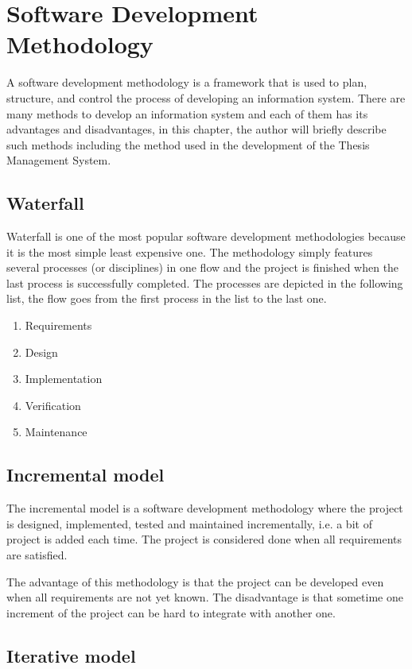 \chapter{Software Development Methodology}

A software development methodology is a framework that is used to plan, structure, and control the process of developing an information system. There are many methods to develop an information system and each of them has its advantages and disadvantages, in this chapter, the author will briefly describe such methods including the method used in the development of the Thesis Management System.

\section{Waterfall}

Waterfall is one of the most popular software development methodologies because it is the most simple least expensive one. The methodology simply features several processes (or disciplines) in one flow and the project is finished when the last process is successfully completed. The processes are depicted in the following list, the flow goes from the first process in the list to the last one.

\begin{enumerate}
    \item Requirements
    \item Design
    \item Implementation
    \item Verification
    \item Maintenance
\end{enumerate}

\section{Incremental model}

The incremental model is a software development methodology where the project is designed, implemented, tested and maintained incrementally, i.e. a bit of project is added each time. The project is considered done when all requirements are satisfied. 

The advantage of this methodology is that the project can be developed even when all requirements are not yet known. The disadvantage is that sometime one increment of the project can be hard to integrate with another one.

\section{Iterative model}

